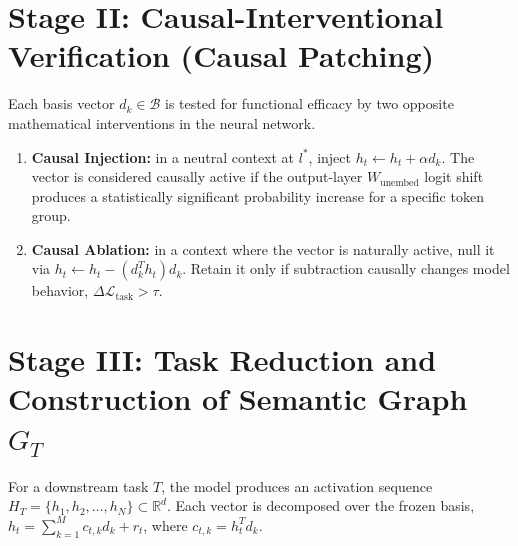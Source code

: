 \documentclass[11pt,a4paper]{article}
\begin{document}
\section{Stage II: Causal-Interventional Verification (Causal Patching)}
Each basis vector $d_k\in\mathcal B$ is tested for functional efficacy by two opposite mathematical interventions in the neural network.
\begin{center}
\end{center}
\begin{enumerate}
\item \textbf{Causal Injection:} in a neutral context at $l^*$, inject $h_t\leftarrow h_t+\alpha d_k$. The vector is considered causally active if the output-layer $W_{\text{unembed}}$ logit shift produces a statistically significant probability increase for a specific token group.
\item \textbf{Causal Ablation:} in a context where the vector is naturally active, null it via $h_t\leftarrow h_t-(d_k^Th_t)d_k$. Retain it only if subtraction causally changes model behavior, $\Delta\mathcal L_{\text{task}}>\tau$.
\end{enumerate}

\section{Stage III: Task Reduction and Construction of Semantic Graph $G_T$}
For a downstream task $T$, the model produces an activation sequence $H_T=\{h_1,h_2,\dots,h_N\}\subset\mathbb R^d$. Each vector is decomposed over the frozen basis, $h_t=\sum_{k=1}^M c_{t,k}d_k+r_t$, where $c_{t,k}=h_t^Td_k$.
\end{document}
